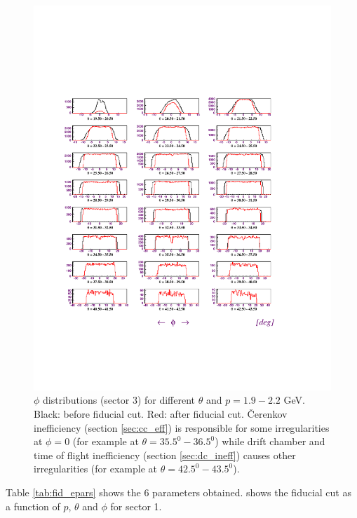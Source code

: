 \begin{figure}[h]
 \begin{center}
 \includegraphics[width = 14cm, bb=60 120 500 610]{data_reduction/img/electron_phis} 
  \caption[$\phi$ distributions (sector 3) for different $\theta$ and $p=1.9-2.2$ GeV]
          { $\phi$ distributions (sector 3) for different $\theta$ and $p=1.9-2.2$ GeV. Black: before fiducial
                     cut. Red: after fiducial cut. 
		     \v Cerenkov inefficiency (section \ref{sec:cc_eff}) is responsible for some irregularities
		     at $\phi = 0$ (for example at  $\theta = 35.5^0 - 36.5^0$) while drift chamber and time of flight
		     inefficiency (section \ref{sec:dc_ineff}) 
		     causes other irregularities (for example at  $\theta = 42.5^0 - 43.5^0$).}
 \label{fig:fidu_ephis}
 \end{center}
\end{figure}
\cia
Table \ref{tab:fid_epars} shows the 6 parameters obtained.  shows the fiducial cut as a function
of $p$, $\theta$ and $\phi$ for sector 1.
